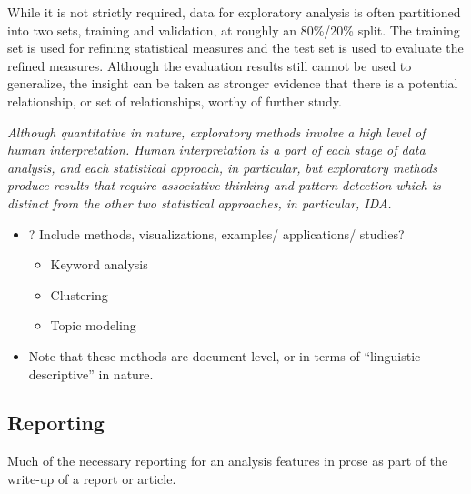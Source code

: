 \documentclass[
]{article}
\providecommand{\tightlist}{%
  \setlength{\itemsep}{0pt}\setlength{\parskip}{0pt}}
\begin{document}
While it is not strictly required, data for exploratory analysis is often partitioned into two sets, training and validation, at roughly an 80\%/20\% split. The training set is used for refining statistical measures and the test set is used to evaluate the refined measures. Although the evaluation results still cannot be used to generalize, the insight can be taken as stronger evidence that there is a potential relationship, or set of relationships, worthy of further study.

\emph{Although quantitative in nature, exploratory methods involve a high level of human interpretation. Human interpretation is a part of each stage of data analysis, and each statistical approach, in particular, but exploratory methods produce results that require associative thinking and pattern detection which is distinct from the other two statistical approaches, in particular, IDA.}

\begin{itemize}
\tightlist
\item
  ? Include methods, visualizations, examples/ applications/ studies?

  \begin{itemize}
  \tightlist
  \item
    Keyword analysis
  \item
    Clustering
  \item
    Topic modeling
  \end{itemize}
\item
  Note that these methods are document-level, or in terms of \citet{Egbert2020} ``linguistic descriptive'' in nature.
\end{itemize}

\hypertarget{reporting}{%
\subsection{Reporting}\label{reporting}}

Much of the necessary reporting for an analysis features in prose as part of the write-up of a report or article.
\end{document}
